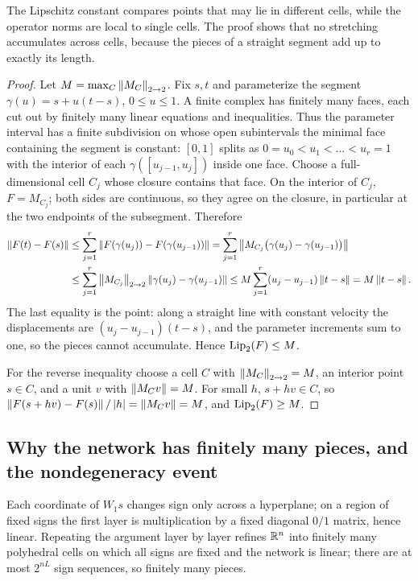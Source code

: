The Lipschitz constant compares points that may lie in different cells, while the operator norms are local to single cells. The proof shows that no stretching accumulates across cells, because the pieces of a straight segment add up to exactly its length.

\begin{proof}
Let $M=\max_C\left\lVert M_C\right\rVert_{2\to 2}$. Fix $s,t$ and parameterize the segment $\gamma(u)=s+u(t-s)$, $0\le u\le 1$. A finite complex has finitely many faces, each cut out by finitely many linear equations and inequalities. Thus the parameter interval has a finite subdivision on whose open subintervals the minimal face containing the segment is constant: $[0,1]$ splits as $0=u_0<u_1<\dots<u_r=1$ with the interior of each $\gamma([u_{j-1},u_j])$ inside one face. Choose a full-dimensional cell $C_j$ whose closure contains that face. On the interior of $C_j$, $F=M_{C_j}$; both sides are continuous, so they agree on the closure, in particular at the two endpoints of the subsegment. Therefore
\begin{align*}
\left\lVert F(t)-F(s)\right\rVert&\le\sum_{j=1}^r\left\lVert F(\gamma(u_j))-F(\gamma(u_{j-1}))\right\rVert
=\sum_{j=1}^r\left\lVert M_{C_j}\bigl(\gamma(u_j)-\gamma(u_{j-1})\bigr)\right\rVert\\
&\le\sum_{j=1}^r\left\lVert M_{C_j}\right\rVert_{2\to 2}\left\lVert \gamma(u_j)-\gamma(u_{j-1})\right\rVert
\le M\sum_{j=1}^r(u_j-u_{j-1})\left\lVert t-s\right\rVert=M\left\lVert t-s\right\rVert.
\end{align*}
The last equality is the point: along a straight line with constant velocity the displacements are $(u_j-u_{j-1})(t-s)$, and the parameter increments sum to one, so the pieces cannot accumulate. Hence $\operatorname{Lip}_2(F)\le M$.

For the reverse inequality choose a cell $C$ with $\left\lVert M_C\right\rVert_{2\to 2}=M$, an interior point $s\in C$, and a unit $v$ with $\left\lVert M_Cv\right\rVert=M$. For small $h$, $s+hv\in C$, so $\left\lVert F(s+hv)-F(s)\right\rVert/\left\lvert h\right\rvert=\left\lVert M_Cv\right\rVert=M$, and $\operatorname{Lip}_2(F)\ge M$.
\end{proof}

\subsection{Why the network has finitely many pieces, and the nondegeneracy event}

Each coordinate of $W_1s$ changes sign only across a hyperplane; on a region of fixed signs the first layer is multiplication by a fixed diagonal $0/1$ matrix, hence linear. Repeating the argument layer by layer refines $\mathbb{R}^n$ into finitely many polyhedral cells on which all signs are fixed and the network is linear; there are at most $2^{nL}$ sign sequences, so finitely many pieces.

